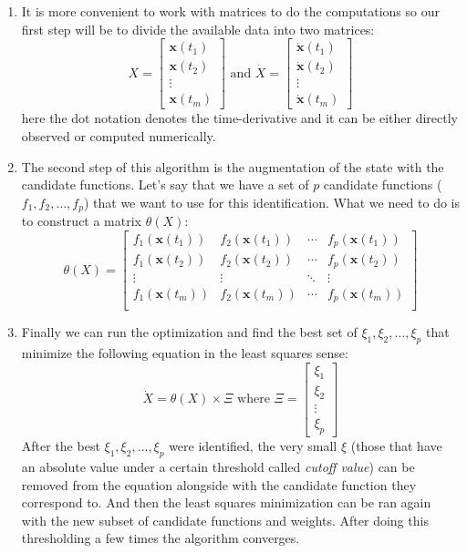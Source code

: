 \documentclass[12pt, letterpaper]{article}
\begin{document}
\begin{enumerate}
	\item It is more convenient to work with matrices to do the computations so our first step will be to divide the available data into two matrices:
	$$X = 
	\begin{bmatrix}
	\mathbf{x}(t_1) \\
	\mathbf{x}(t_2) \\
	\vdots \\
	\mathbf{x}(t_m)
	\end{bmatrix}
	\text{ and }
	\dot{X} =
	\begin{bmatrix}
	\dot{\mathbf{x}}(t_1) \\
	\dot{\mathbf{x}}(t_2) \\
	\vdots \\
	\dot{\mathbf{x}}(t_m)
	\end{bmatrix}
	$$
	here the dot notation denotes the time-derivative and it can be either directly observed or computed numerically.

	\item The second step of this algorithm is the augmentation of the state with the candidate functions. 
	Let's say that we have a set of $p$ candidate functions ($f_1, f_2, \dots, f_p$) that we want to use for this identification. 
	What we need to do is to construct a matrix $\theta(X)$:
	$$\theta(X) = 
	\begin{bmatrix}
	f_1(\mathbf{x}(t_1)) & f_2(\mathbf{x}(t_1)) & \cdots & f_p(\mathbf{x}(t_1))\\
	f_1(\mathbf{x}(t_2)) & f_2(\mathbf{x}(t_2)) & \cdots & f_p(\mathbf{x}(t_2))\\
	\vdots & \vdots  & \ddots & \vdots\\
	f_1(\mathbf{x}(t_m)) & f_2(\mathbf{x}(t_m)) & \cdots & f_p(\mathbf{x}(t_m))\\
	\end{bmatrix}
	$$

	\item Finally we can run the optimization and find the best set of $\xi_1, \xi_2, \dots, \xi_p$ that minimize the following equation in the least squares sense:
	$$\dot{X} = \theta(X) \times \Xi \text{ where } \Xi = 
	\begin{bmatrix}
	\xi_1 \\
	\xi_2 \\
	\vdots \\
	\xi_p
	\end{bmatrix}
	$$
	After the best $\xi_1, \xi_2, \dots, \xi_p$ were identified, the very small $\xi$ (those that have an absolute value under a certain threshold called {\em cutoff value}) can be removed from the equation alongside with the candidate function they correspond to. 
	And then the least squares minimization can be ran again with the new subset of candidate functions and weights. 
	After doing this thresholding a few times the algorithm converges.

\end{enumerate}
\end{document}
